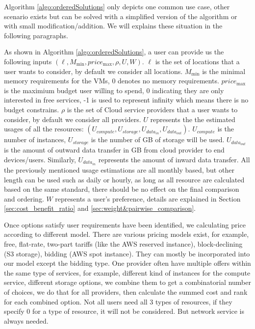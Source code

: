 Algorithm \ref{algo:orderedSolutions} only depicts one common use case, other scenario exists but can be solved with a simplified version of the algorithm or with small modification/addition. We will explains these situation in the following paragraphs.

As shown in Algorithm \ref{algo:orderedSolutions}, a user can provide us the following inputs $( \ell , M_{\min } , price_{\max} , \rho , U , W )$. $\ell$ is the set of locations that a user wants to consider, by default we consider all locations. $M_{\min}$ is the minimal memory requirements for the VMs, 0 denotes no memory requirements. $price_{\max}$ is the maximium budget user willing to spend, 0 indicating they are only interested in free services, -1 is used to represent infinity which means there is no budget constrains. $\rho$ is the set of Cloud service providers that a user wants to consider, by default we consider all providers. $U$ represents the the estimated usages of all the resources: $( U_{compute} , U_{storage} , U_{data_{in}} , U_{data_{out}} )$. $U_{compute}$ is the number of instances, $U_{storage}$ is the number of GB of storage will be used. $U_{data_{out}}$ is the amount of outward data transfer in GB from cloud provider to end devices/users. Similarly, $U_{data_{in}}$ represents the amount of inward data transfer. All the previously mentioned usage estimations are all monthly based, but other length can be used such as daily or hourly, as long as all resource are calculated based on the same standard, there should be no effect on the final comparison and ordering. $W$ represents a user's preference, details are explained in Section \ref{sec:cost_benefit_ratio} and \ref{sec:weight&pairwise_comparison}.

Once options satisfy user requirements have been identified, we calculating price according to different model. There are various pricing models    \cite{weinman2011axiomatic} exist, for example, free, flat-rate, two-part tariffs (like the AWS reserved instance), block-declining (S3 storage), bidding (AWS spot instance). They can mostly be incorporated into our model except the bidding type. One provider often have multiple offers within the same type of services, for example, different kind of instances for the compute service, different storage options, we combine them to get a combinatorial number of choices, we do that for all providers, then calculate the summed cost and rank for each combined option. Not all users need all 3 types of resources, if they specify 0 for a type of resource, it will not be considered. But network service is always needed.

